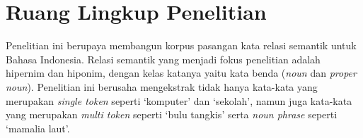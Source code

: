 \section{Ruang Lingkup Penelitian}
Penelitian ini berupaya membangun korpus pasangan kata relasi semantik untuk Bahasa Indonesia. Relasi semantik yang menjadi fokus penelitian adalah hipernim dan hiponim, dengan kelas katanya yaitu kata benda (\textit{noun} dan \textit{proper noun}). Penelitian ini berusaha mengekstrak tidak hanya kata-kata yang merupakan \textit{single token} seperti `komputer' dan `sekolah', namun juga kata-kata yang merupakan \textit{multi token} seperti `bulu tangkis' serta \textit{noun phrase} seperti `mamalia laut'.


